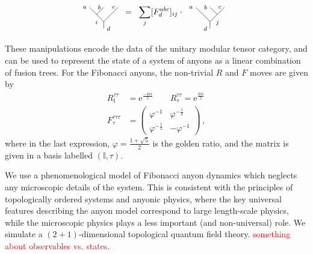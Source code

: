 \documentclass[aps, prl, letterpaper, twocolumn, superscriptaddress, notitlepage, 10pt]{revtex4-1}
\newcommand{\e}{\mathrm{e}}
\newcommand{\dude}[1]{\textcolor{red}{#1}}
\begin{document}
	\begin{align}
		\begin{tikzpicture}[baseline=0.6cm,scale=0.3]
			\draw(0,0)--(0,1)--(-2,3);
			\draw(0,3)--(-1,2);
			\draw(2,3)--(0,1);
			\node at (-0.45,1.6) [anchor=north east] {{\scriptsize $i$}};
			\node at (0,0) [anchor=west] {{\scriptsize $d$}};
			\node at (2,3) [anchor=east] {{\scriptsize $c$}};
			\node at (0,3) [anchor=east] {{\scriptsize $b$}};
			\node at (-2,3) [anchor=east] {{\scriptsize $a$}};
		\end{tikzpicture}
		&\;\;=\;\;\sum_j[F^{abc}_d]_{ij}\cdot\;
		\begin{tikzpicture}[baseline=0.6cm,scale=0.3]		
			\draw(0,0)--(0,1)--(-2,3);
			\draw(0,3)--(1,2);
			\draw(2,3)--(0,1);
			\node at (0.42,1.63) [anchor=north west] {{\scriptsize $j$}};
			\node at (0,0) [anchor=east] {{\scriptsize $d$}};
			\node at (2,3) [anchor=east] {{\scriptsize $c$}};
			\node at (0,3) [anchor=east] {{\scriptsize $b$}};
			\node at (-2,3) [anchor=east] {{\scriptsize $a$}};
		\end{tikzpicture}
	\end{align}

These manipulations encode the data of the unitary modular tensor category, and can be used to represent the state of a system of anyons as a linear combination of fusion trees. For the Fibonacci anyons, the non-trivial $R$ and $F$ moves are given by
\begin{align}
	R_{\mathbb{I}}^{\tau\tau}&= \e^{\frac{-4\pi i}{5}}\qquad R_\tau^{\tau\tau}= \e^{\frac{3\pi i}{5}}\\
	F_{\tau}^{\tau\tau\tau} &= \begin{pmatrix}\varphi^{-1}&\varphi^{-\frac{1}{2}}\\\varphi^{-\frac{1}{2}}&-\varphi^{-1}\end{pmatrix} \,,
\end{align}
where in the last expression, $\varphi=\frac{1+\sqrt{5}}{2}$ is the golden ratio, and the matrix is given in a basis labelled $(\mathbb{I},\tau)$.

We use a phenomenological model of Fibonacci anyon dynamics which neglects any 
microscopic details of the system. 
This is consistent with the principles of topologically 
ordered systems and anyonic physics, where the key universal features describing the 
anyon model correspond to large length-scale physics, while the microscopic physics plays 
a less important (and non-universal) role.
We simulate a $(2+1)$-dimensional topological quantum field theory.
\dude{something about observables vs. states.}
\end{document}
